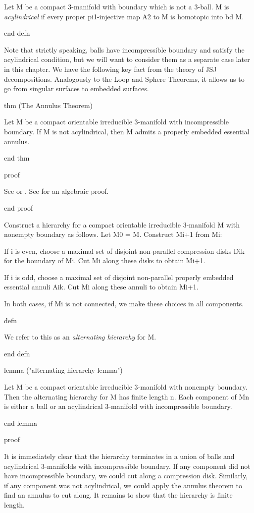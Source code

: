 Let M be a compact 3-manifold with boundary which is not a 3-ball. M is
\emph{acylindrical} if every proper pi1-injective map A2 to M is homotopic into
bd M.

end defn

Note that strictly speaking, balls have incompressible boundary and satisfy the
acylindrical condition, but we will want to consider them as a separate case
later in this chapter. We have the following key fact from the theory of JSJ
decompositions.  Analogously to the Loop and Sphere Theorems, it allows us to
go from singular surfaces to embedded surfaces.

thm (The Annulus Theorem)

Let M be a compact orientable irreducible 3-manifold with incompressible
boundary. If M is not acylindrical, then M admits a properly embedded essential
annulus.

end thm

proof

See \cite{JacoShalen} or \cite{Johannson}. See \cite{Scottannulus} for an
algebraic proof.

end proof

Construct a hierarchy for a compact orientable irreducible 3-manifold M with
nonempty boundary as follows.  Let M0 = M.  Construct Mi+1 from Mi:

If i is even, choose a maximal set of disjoint non-parallel compression disks
Dik for the boundary of Mi. Cut Mi along these disks to obtain Mi+1.

If i is odd, choose a maximal set of disjoint non-parallel properly embedded
essential annuli Aik. Cut Mi along these annuli to obtain Mi+1.

In both cases, if Mi is not connected, we make these choices in all components.

defn

We refer to this as an \emph{alternating hierarchy} for M.

end defn

lemma ("alternating hierarchy lemma")

Let M be a compact orientable irreducible 3-manifold with nonempty boundary.
Then the alternating hierarchy for M has finite length n. Each component of Mn
is either a ball or an acylindrical 3-manifold with incompressible boundary.

end lemma

proof

It is immediately clear that the hierarchy terminates in a union of balls and
acylindrical 3-manifolds with incompressible boundary. If any component did not
have incompressible boundary, we could cut along a compression disk.
Similarly, if any component was not acylindrical, we could apply the annulus
theorem to find an annulus to cut along. It remains to show that the hierarchy
is finite length.

